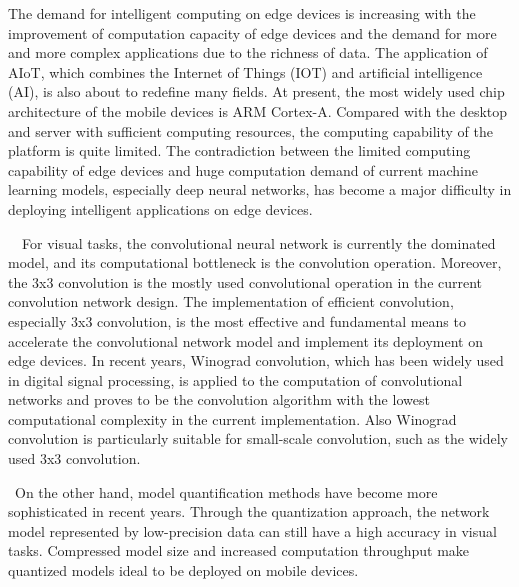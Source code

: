 \begin{abstract*}

  The demand for intelligent computing on edge devices is increasing 
  with the improvement of computation capacity of edge devices and 
  the demand for more and more complex applications due to the 
  richness of data. 
  The application of AIoT, which combines the Internet of Things (IOT) and artificial intelligence (AI), is also about to redefine many fields. At present, the most widely used chip architecture of the mobile devices is ARM Cortex-A. Compared with the desktop and server with sufficient computing resources, the computing capability of the platform is quite limited. The contradiction between the limited computing capability of edge devices and huge computation demand of current machine learning models, especially deep neural networks,  has become a major difficulty in deploying intelligent applications on edge devices.

  For visual tasks, the convolutional neural network is currently the dominated model, and its computational bottleneck is the convolution operation. Moreover, the 3x3 convolution is the mostly used convolutional operation in the current convolution network design. The implementation of efficient convolution, especially 3x3 convolution, is the most effective and fundamental means to accelerate the convolutional network model and implement its deployment on edge devices. In recent years, Winograd convolution, which has been widely used in digital signal processing, is applied to the computation of convolutional networks and proves to be the convolution algorithm with the lowest computational complexity in the current implementation. Also Winograd convolution is particularly suitable for small-scale convolution, such as the widely used 3x3 convolution.

 On the other hand, model quantification methods have become more sophisticated in recent years. Through the quantization approach, the network model represented by low-precision data can still have a high accuracy in visual tasks. Compressed model size and increased computation throughput make quantized models ideal to be deployed on mobile devices.


\end{abstract*}
